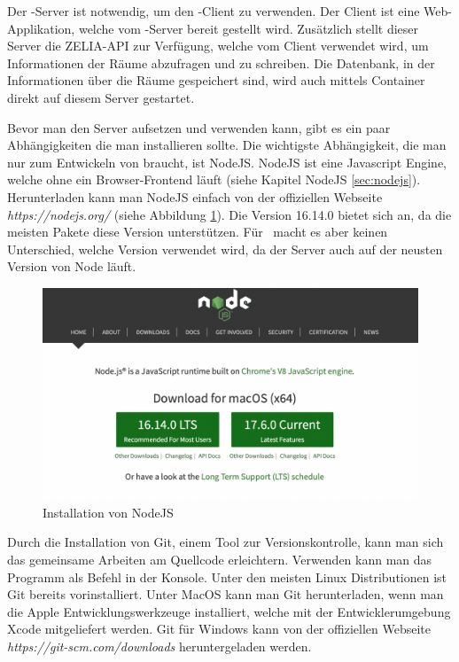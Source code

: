 
Der \ZELIA-Server ist notwendig, um den \ZELIA-Client zu verwenden. Der Client ist eine Web-Applikation, welche vom \ZELIA-Server bereit gestellt wird. Zusätzlich stellt dieser Server die ZELIA-API zur Verfügung, welche vom Client verwendet wird, um Informationen der Räume abzufragen und zu schreiben. Die Datenbank, in der Informationen über die Räume gespeichert sind, wird auch mittels Container direkt auf diesem Server gestartet.

\begin{minipage}{\textwidth}
    
    Bevor man den Server aufsetzen und verwenden kann, gibt es ein paar Abhängigkeiten die man installieren sollte. Die wichtigste Abhängigkeit, die man nur zum Entwickeln von \ZELIA braucht, ist NodeJS. NodeJS ist eine Javascript Engine, welche ohne ein Browser-Frontend läuft (siehe Kapitel NodeJS \ref{sec:nodejs}). Herunterladen kann man NodeJS einfach von der offiziellen Webseite \emph{https://nodejs.org/} (siehe Abbildung \ref{fig:nodejsdownload}). Die Version 16.14.0 bietet sich an, da die meisten Pakete diese Version unterstützen. Für \ZELIA\ macht es aber keinen Unterschied, welche Version verwendet wird, da der Server auch auf der neusten Version von Node läuft.
\end{minipage}
    
\begin{figure}[H]
    \centering
    \includegraphics[width=120mm]{media/Handbuch/nodejs.png}
    \caption{Installation von NodeJS}
    \label{fig:nodejsdownload}
\end{figure}


Durch die Installation von Git, einem Tool zur Versionskontrolle, kann man sich das gemeinsame Arbeiten am Quellcode erleichtern. Verwenden kann man das Programm als Befehl in der Konsole. Unter den meisten Linux Distributionen ist Git bereits vorinstalliert. Unter MacOS kann man Git herunterladen, wenn man die Apple Entwicklungswerkzeuge installiert, welche mit der Entwicklerumgebung Xcode mitgeliefert werden. Git für Windows kann von der offiziellen Webseite \emph{https://git-scm.com/downloads} heruntergeladen werden.

